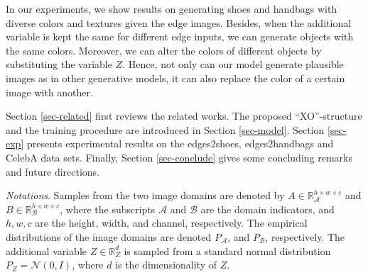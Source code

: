 \documentclass[conference]{IEEEtran}
\theoremstyle{definition}
\begin{document}
In our experiments, we show results on generating shoes and handbags with diverse colors and textures given the edge images. Besides, when the
additional variable is kept the same for different edge inputs, we can generate objects with the same colors. Moreover, we can alter the colors
of different objects by substituting the variable $Z$. Hence,
not only 
can our model generate plausible images as in other generative models, it can also replace the color of a certain image with another. 

Section \ref{sec-related} first reviews the related works. The proposed ``XO''-structure and the training procedure are introduced in Section \ref{sec-model}. Section \ref{sec-exp} presents experimental results on the {\sf edges2shoes}, {\sf edges2handbags} and {\sf CelebA} data sets.
Finally, Section \ref{sec-conclude} gives some concluding remarks and future directions.





\vspace{.1in}
\noindent
{\em Notations}.
Samples from the two image domains are denoted by $A\in \mathbb R_{\mathcal A}^{h\times w\times c}$ and $B \in \mathbb R_{\mathcal B}^{h\times
w\times c}$, where the subscripts $\mathcal A$ and $\mathcal B$ are the domain indicators,
and $h, w, c$ 
are the height, width, and channel,
respectively. The empirical distributions of the image domains are denoted $P_{\mathcal A}$, and $P_{\mathcal B}$, respectively. The additional
variable $Z\in \mathbb R_{Z}^d$ is sampled from a standard normal distribution $P_{Z}=\mathcal N(0, I)$, where $d$ is the dimensionality of $Z$. 
\end{document}
